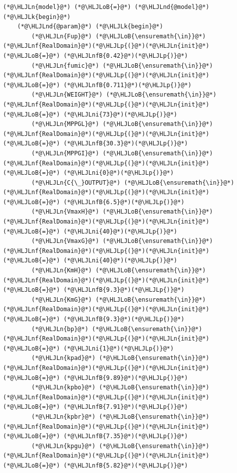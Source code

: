 \documentclass[12pt,a4paper]{article}
\newcommand{\HLJLk}[1]{\textcolor[RGB]{148,91,176}{\textbf{#1}}}
\newcommand{\HLJLn}[1]{#1}
\newcommand{\HLJLnd}[1]{\textcolor[RGB]{214,102,97}{#1}}
\newcommand{\HLJLnf}[1]{\textcolor[RGB]{66,102,213}{#1}}
\newcommand{\HLJLnfB}[1]{\textcolor[RGB]{59,151,46}{#1}}
\newcommand{\HLJLni}[1]{\textcolor[RGB]{59,151,46}{#1}}
\newcommand{\HLJLoB}[1]{\textcolor[RGB]{102,102,102}{\textbf{#1}}}
\newcommand{\HLJLp}[1]{#1}
\begin{document}
\begin{lstlisting}
(*@\HLJLn{model}@*) (*@\HLJLoB{=}@*) (*@\HLJLnd{@model}@*) (*@\HLJLk{begin}@*)
    (*@\HLJLnd{@param}@*) (*@\HLJLk{begin}@*)
        (*@\HLJLn{Fup}@*) (*@\HLJLoB{\ensuremath{\in}}@*) (*@\HLJLnf{RealDomain}@*)(*@\HLJLp{(}@*)(*@\HLJLn{init}@*) (*@\HLJLoB{=}@*) (*@\HLJLnfB{0.42}@*)(*@\HLJLp{)}@*)
        (*@\HLJLn{fumic}@*) (*@\HLJLoB{\ensuremath{\in}}@*) (*@\HLJLnf{RealDomain}@*)(*@\HLJLp{(}@*)(*@\HLJLn{init}@*) (*@\HLJLoB{=}@*) (*@\HLJLnfB{0.711}@*)(*@\HLJLp{)}@*)
        (*@\HLJLn{WEIGHT}@*) (*@\HLJLoB{\ensuremath{\in}}@*) (*@\HLJLnf{RealDomain}@*)(*@\HLJLp{(}@*)(*@\HLJLn{init}@*) (*@\HLJLoB{=}@*) (*@\HLJLni{73}@*)(*@\HLJLp{)}@*)
        (*@\HLJLn{MPPGL}@*) (*@\HLJLoB{\ensuremath{\in}}@*) (*@\HLJLnf{RealDomain}@*)(*@\HLJLp{(}@*)(*@\HLJLn{init}@*) (*@\HLJLoB{=}@*) (*@\HLJLnfB{30.3}@*)(*@\HLJLp{)}@*)
        (*@\HLJLn{MPPGI}@*) (*@\HLJLoB{\ensuremath{\in}}@*) (*@\HLJLnf{RealDomain}@*)(*@\HLJLp{(}@*)(*@\HLJLn{init}@*) (*@\HLJLoB{=}@*) (*@\HLJLni{0}@*)(*@\HLJLp{)}@*)
        (*@\HLJLn{C{\_}OUTPUT}@*) (*@\HLJLoB{\ensuremath{\in}}@*) (*@\HLJLnf{RealDomain}@*)(*@\HLJLp{(}@*)(*@\HLJLn{init}@*) (*@\HLJLoB{=}@*) (*@\HLJLnfB{6.5}@*)(*@\HLJLp{)}@*)
        (*@\HLJLn{VmaxH}@*) (*@\HLJLoB{\ensuremath{\in}}@*) (*@\HLJLnf{RealDomain}@*)(*@\HLJLp{(}@*)(*@\HLJLn{init}@*) (*@\HLJLoB{=}@*) (*@\HLJLni{40}@*)(*@\HLJLp{)}@*)
        (*@\HLJLn{VmaxG}@*) (*@\HLJLoB{\ensuremath{\in}}@*) (*@\HLJLnf{RealDomain}@*)(*@\HLJLp{(}@*)(*@\HLJLn{init}@*) (*@\HLJLoB{=}@*) (*@\HLJLni{40}@*)(*@\HLJLp{)}@*)
        (*@\HLJLn{KmH}@*) (*@\HLJLoB{\ensuremath{\in}}@*) (*@\HLJLnf{RealDomain}@*)(*@\HLJLp{(}@*)(*@\HLJLn{init}@*) (*@\HLJLoB{=}@*) (*@\HLJLnfB{9.3}@*)(*@\HLJLp{)}@*)
        (*@\HLJLn{KmG}@*) (*@\HLJLoB{\ensuremath{\in}}@*) (*@\HLJLnf{RealDomain}@*)(*@\HLJLp{(}@*)(*@\HLJLn{init}@*) (*@\HLJLoB{=}@*) (*@\HLJLnfB{9.3}@*)(*@\HLJLp{)}@*)
        (*@\HLJLn{bp}@*) (*@\HLJLoB{\ensuremath{\in}}@*) (*@\HLJLnf{RealDomain}@*)(*@\HLJLp{(}@*)(*@\HLJLn{init}@*) (*@\HLJLoB{=}@*) (*@\HLJLni{1}@*)(*@\HLJLp{)}@*)
        (*@\HLJLn{kpad}@*) (*@\HLJLoB{\ensuremath{\in}}@*) (*@\HLJLnf{RealDomain}@*)(*@\HLJLp{(}@*)(*@\HLJLn{init}@*) (*@\HLJLoB{=}@*) (*@\HLJLnfB{9.89}@*)(*@\HLJLp{)}@*)
        (*@\HLJLn{kpbo}@*) (*@\HLJLoB{\ensuremath{\in}}@*) (*@\HLJLnf{RealDomain}@*)(*@\HLJLp{(}@*)(*@\HLJLn{init}@*) (*@\HLJLoB{=}@*) (*@\HLJLnfB{7.91}@*)(*@\HLJLp{)}@*)
        (*@\HLJLn{kpbr}@*) (*@\HLJLoB{\ensuremath{\in}}@*) (*@\HLJLnf{RealDomain}@*)(*@\HLJLp{(}@*)(*@\HLJLn{init}@*) (*@\HLJLoB{=}@*) (*@\HLJLnfB{7.35}@*)(*@\HLJLp{)}@*)
        (*@\HLJLn{kpgu}@*) (*@\HLJLoB{\ensuremath{\in}}@*) (*@\HLJLnf{RealDomain}@*)(*@\HLJLp{(}@*)(*@\HLJLn{init}@*) (*@\HLJLoB{=}@*) (*@\HLJLnfB{5.82}@*)(*@\HLJLp{)}@*)

\end{lstlisting}
\end{document}

